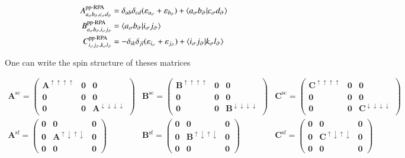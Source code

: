 \documentclass[aip,jcp,reprint,noshowkeys,superscriptaddress]{revtex4-1}
\newcommand{\ppRPA}{\text{pp-RPA}}
\newcommand{\e}[1]{\eps_{#1}}
\newcommand{\bO}{\mathbf{0}}
\newcommand{\bA}[2]{\mathbf{A}_{#1}^{#2}}
\newcommand{\bB}[2]{\mathbf{B}_{#1}^{#2}}
\newcommand{\bC}[2]{\mathbf{C}_{#1}^{#2}}
\newcommand{\eps}{\varepsilon}
\newcommand{\sig}{\sigma}
\newcommand{\bsig}{{\Bar{\sigma}}}
\newcommand{\up}{\uparrow}
\newcommand{\dw}{\downarrow}
\newcommand{\spc}{\text{sc}}
\newcommand{\spf}{\text{sf}}
\begin{document}
\begin{subequations}
\begin{align}
	A_{a_\sig b_\bsig,c_\sig d_\bsig}^{\ppRPA} & = \delta_{ab} \delta_{cd} (\e{a_\sig} + \e{b_\bsig}) + \braket{a_\sig b_\bsig}{c_\sig d_\bsig}
	\\ 
	B_{a_\sig b_\bsig,i_\sig j_\bsig}^{\ppRPA} & = \braket{a_\sig b_\bsig }{i_\sig j_\bsig}
	\\ 
	C_{i_\sig j_\bsig,k_\sig l_\bsig}^{\ppRPA} & = - \delta_{ik} \delta_{jl} (\e{i_\sig} + \e{j_\bsig}) + \braket{i_\sig j_\bsig}{k_\sig l_\bsig}
\end{align}
\end{subequations}

One can write the spin structure of theses matrices 

\begin{subequations}
\begin{align}
\bA{}{\spc} =
 \begin{pmatrix}
 \bA{}{\up\up\up\up} & \bO & \bO\\
 \bO & \bO & \bO\\
 \bO & \bO & \bA{}{\dw\dw\dw\dw}
\end{pmatrix}
&
\bB{}{\spc}= \begin{pmatrix}
 \bB{}{\up\up\up\up} & \bO & \bO\\
 \bO & \bO & \bO\\
\bO & \bO & \bB{}{\dw\dw\dw\dw}
\end{pmatrix}
& 
\bC{}{\spc}= \begin{pmatrix}
 \bC{}{\up\up\up\up} & \bO &\bO\\
 \bO & \bO & \bO\\
 \bO &\bO & \bC{}{\dw\dw\dw\dw}
\end{pmatrix}
\\
\bA{}{\spf} =
 \begin{pmatrix}
\bO &\bO & \bO\\
 \bO & \bA{}{\up\dw\up\dw} & \bO\\
 \bO & \bO & \bO
\end{pmatrix}
&
\bB{}{\spf}= \begin{pmatrix}
 \bO &\bO & \bO\\
 \bO& \bB{}{\up\dw\up\dw} &\bO\\
 \bO & \bO & \bO
\end{pmatrix}
& 
\bC{}{\spf}= \begin{pmatrix}
 \bO & \bO& \bO\\
\bO & \bC{}{\up\dw\up\dw} &\bO\\
 \bO & \bO & \bO
\end{pmatrix}
\end{align}
\end{subequations}
\end{document}
